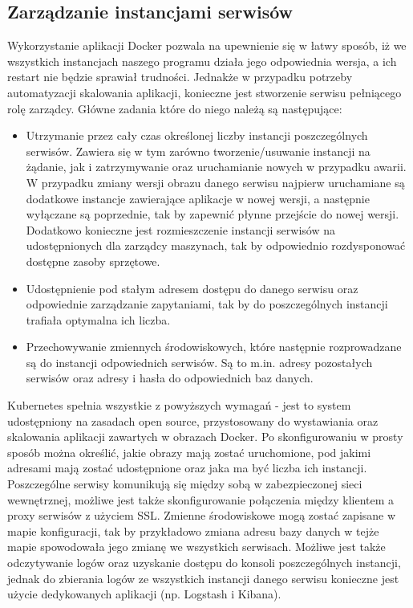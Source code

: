 \documentclass[11pt,a4paper,twoside]{article}
\begin{document}
\subsection{Zarządzanie instancjami serwisów}
Wykorzystanie aplikacji Docker pozwala na upewnienie się w łatwy sposób, iż we wszystkich instancjach naszego programu działa jego odpowiednia wersja, a ich restart nie będzie sprawiał trudności. Jednakże w przypadku potrzeby automatyzacji skalowania aplikacji, konieczne jest stworzenie serwisu pełniącego rolę zarządcy. Główne zadania które do niego należą są następujące:

\begin{itemize}
\item Utrzymanie przez cały czas określonej liczby instancji poszczególnych serwisów. Zawiera się w tym zarówno tworzenie/usuwanie instancji na żądanie, jak i zatrzymywanie oraz uruchamianie nowych w przypadku awarii. W przypadku zmiany wersji obrazu danego serwisu najpierw uruchamiane są dodatkowe instancje zawierające aplikacje w nowej wersji, a następnie wyłączane są poprzednie, tak by zapewnić płynne przejście do nowej wersji. Dodatkowo konieczne jest rozmieszczenie instancji serwisów na udostępnionych dla zarządcy maszynach, tak by odpowiednio rozdysponować dostępne zasoby sprzętowe.
\item Udostępnienie pod stałym adresem dostępu do danego serwisu oraz odpowiednie zarządzanie zapytaniami, tak by do poszczególnych instancji trafiała optymalna ich liczba.
\item Przechowywanie zmiennych środowiskowych, które następnie rozprowadzane są do instancji odpowiednich serwisów. Są to m.in. adresy pozostałych serwisów oraz adresy i hasła do odpowiednich baz danych.
\end{itemize}

Kubernetes spełnia wszystkie z powyższych wymagań - jest to system udostępniony na zasadach open source, przystosowany do wystawiania oraz skalowania aplikacji zawartych w obrazach Docker. Po skonfigurowaniu w prosty sposób można określić, jakie obrazy mają zostać uruchomione, pod jakimi adresami mają zostać udostępnione oraz jaka ma być liczba ich instancji. Poszczególne serwisy komunikują się między sobą w zabezpieczonej sieci wewnętrznej, możliwe jest także skonfigurowanie połączenia między klientem a proxy serwisów z użyciem SSL. Zmienne środowiskowe mogą zostać zapisane w mapie konfiguracji, tak by przykładowo zmiana adresu bazy danych w tejże mapie spowodowała jego zmianę we wszystkich serwisach. Możliwe jest także odczytywanie logów oraz uzyskanie dostępu do konsoli poszczególnych instancji, jednak do zbierania logów ze wszystkich instancji danego serwisu konieczne jest użycie dedykowanych aplikacji (np. Logstash i Kibana).
\end{document}
